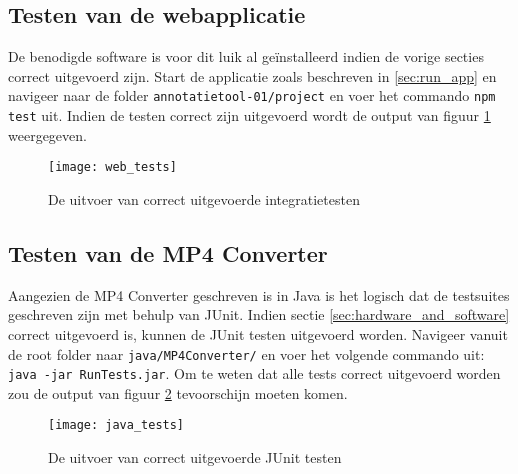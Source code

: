\subsection{Testen van de webapplicatie}
\label{sec:test_exec_web}
De benodigde software is voor dit luik al ge\"installeerd indien de vorige secties correct uitgevoerd zijn. Start de applicatie zoals beschreven in \ref{sec:run_app} en navigeer naar de folder \texttt{annotatietool-01/project} en voer het commando \texttt{npm test} uit. Indien de testen correct zijn uitgevoerd wordt de output van figuur \ref{fig:web_tests} weergegeven.
\begin{figure}[ht]
	\texttt{[image: web\_tests]}  
	\caption{De uitvoer van correct uitgevoerde integratietesten}
    \label{fig:web_tests}
\end{figure}
\subsection{Testen van de MP4 Converter}
\label{sec:test_exec_java}
Aangezien de MP4 Converter geschreven is in Java is het logisch dat de testsuites geschreven zijn met behulp van JUnit. Indien sectie \ref{sec:hardware_and_software} correct uitgevoerd is, kunnen de JUnit testen uitgevoerd worden. Navigeer vanuit de root folder naar \texttt{java/MP4Converter/} en voer het volgende commando uit:
\texttt{java -jar RunTests.jar}. Om te weten dat alle tests correct uitgevoerd worden zou de output van figuur \ref{fig:java_tests} tevoorschijn moeten komen.
\begin{figure}[ht]
	\texttt{[image: java\_tests]}  
	\caption{De uitvoer van correct uitgevoerde JUnit testen}
    \label{fig:java_tests}
\end{figure}

